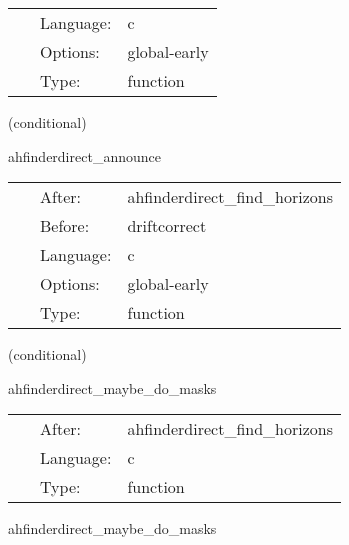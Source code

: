  \begin{tabular*}{160mm}{cll} 
~ & Language:  & c \\ 
~ & Options:  & global-early \\ 
~ & Type:  & function \\ 
\end{tabular*} 


\vspace{5mm}

   (conditional) 

\hspace{5mm} ahfinderdirect\_announce 

\hspace{5mm}{\it announce horizon position(s) to other thorns } 


\hspace{5mm}

 \begin{tabular*}{160mm}{cll} 
~ & After:  & ahfinderdirect\_find\_horizons \\ 
~ & Before:  & driftcorrect \\ 
~ & Language:  & c \\ 
~ & Options:  & global-early \\ 
~ & Type:  & function \\ 
\end{tabular*} 


\vspace{5mm}

   (conditional) 

\hspace{5mm} ahfinderdirect\_maybe\_do\_masks 

\hspace{5mm}{\it set mask(s) based on apparent horizon position(s) } 


\hspace{5mm}

 \begin{tabular*}{160mm}{cll} 
~ & After:  & ahfinderdirect\_find\_horizons \\ 
~ & Language:  & c \\ 
~ & Type:  & function \\ 
\end{tabular*} 


\vspace{5mm}


\hspace{5mm} ahfinderdirect\_maybe\_do\_masks 

